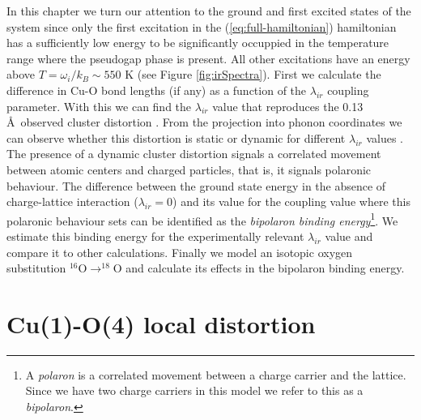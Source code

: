 In this chapter we turn our attention to the ground and first excited states of the system since only the first excitation in the (\ref{eq:full-hamiltonian}) hamiltonian has a sufficiently low energy to be significantly occuppied in the temperature range where the pseudogap phase is present.
All other excitations have an energy above $T=\omega_i/k_B \sim 550$ K (see Figure \ref{fig:irSpectra}).
First we calculate the difference in Cu-O bond lengths (if any) as a function of the $\lambda_{ir}$ coupling parameter.
With this we can find the $\lambda_{ir}$ value that reproduces the 0.13 \AA\ observed cluster distortion \cite{MustredeLeon1990}.
From the projection into phonon coordinates we can observe whether this distortion is static or dynamic for different $\lambda_{ir}$ values \cite{MustredeLeon1992}.
The presence of a dynamic cluster distortion signals a correlated movement between atomic centers and charged particles, that is, it signals polaronic behaviour.
The difference between the ground state energy in the absence of charge-lattice interaction ($\lambda_{ir}=0$) and its value for the coupling value where this polaronic behaviour sets can be identified as the \textit{bipolaron binding energy}\footnote{A \textit{polaron} is a correlated movement between a charge carrier and the lattice. Since we have two charge carriers in this model we refer to this as a \textit{bipolaron}.}.
We estimate this binding energy for the experimentally relevant $\lambda_{ir}$ value and compare it to other calculations.
Finally we model an isotopic oxygen substitution $^{16}$O$\rightarrow ^{18}$O and calculate its effects in the bipolaron binding energy.

\section{Cu(1)-O(4) local distortion}
\label{sec:grd-phonon-proj}

